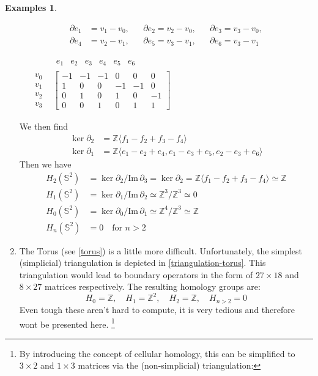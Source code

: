 \documentclass[draft]{scrartcl}
\theoremstyle{plain}
\theoremstyle{definition}
\newtheorem{examples}[theorem]{Examples}
\theoremstyle{remark}
\newcommand{\Z}{\mathbb{Z}}
\newcommand{\Sp}{\mathbb{S}}
\newcommand{\im}{\mathrm{Im}\,}
\begin{document}
\begin{examples}
\begin{enumerate}
\parbox[c]{.5\linewidth}{
\begin{align*}
	\partial e_1&=v_1-v_0,&&\partial e_2=v_2-v_0,&&\partial e_3=v_3-v_0,\\
	\partial e_4&=v_2-v_1,&&\partial e_5=v_3-v_1,&&\partial e_6=v_3-v_1
\end{align*}}%
\parbox[c]{.5\linewidth}{$
\quad\begin{matrix}
	&\begin{matrix}e_1&e_2&e_3&e_4&e_5&e_6	\end{matrix}\\
	\begin{matrix}v_0\\v_1\\v_2\\v_3\end{matrix}&
	\begin{bmatrix}
	-1	&-1	&-1	&0	&0	&0\\
	1	&0	&0	&-1	&-1	&0\\
	0	&1	&0	&1	&0	&-1\\
	0	&0	&1	&0	&1	&1
	\end{bmatrix}
\end{matrix}$
}
We then find
\begin{align*}
\ker \partial_2&=\Z\langle f_1-f_2+f_3-f_4\rangle\\
\ker \partial_1&=\Z\langle e_1-e_2+e_4,e_1-e_3+e_5, e_2-e_3+e_6 \rangle
\end{align*}
Then we have
\begin{align*}
	H_2(\Sp^2)&=\ker \partial_2/\im \partial_3=\ker \partial_2=\Z\langle f_1-f_2+f_3-f_4\rangle\simeq\Z\\
	H_1(\Sp^2)&=\ker \partial_1/\im \partial_2\simeq\Z^3/\Z^3\simeq 0\\
	H_0(\Sp^2)&=\ker\partial_0/\im \partial_1\simeq \Z^4/\Z^3\simeq \Z\\
	H_n(\Sp^2)&=0\quad \text{for $n>2$}
\end{align*}


\item The Torus (see \autoref{torus}) is a little more difficult. Unfortunately, the simplest (simplicial) triangulation is depicted in \autoref{triangulation-torus}. This triangulation would lead to boundary operators in the form of  $27\times 18$  and  $8\times 27$ matrices respectively.  The resulting homology groups are:
\[
H_0=\Z,\quad H_1=\Z^2,\quad H_2=\Z,\quad H_{n>2}=0
\]
Even tough these aren't hard to compute, it is very tedious and therefore wont be presented here.
\footnote{By introducing the concept of cellular homology, this can be simplified to $3\times 2$ and $1\times 3$ matrices via the \glqq(non-simplicial)  triangulation\grqq:	
	
}
\end{enumerate}
\end{examples}
\end{document}
